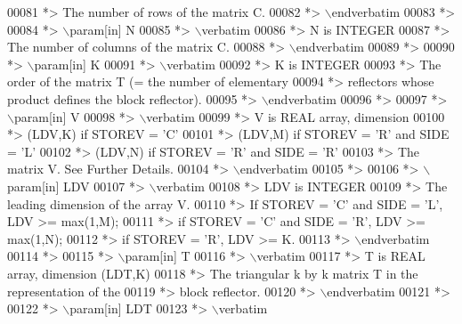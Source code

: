 \begin{DoxyCode}
00081 \textcolor{comment}{*>          The number of rows of the matrix C.}
00082 \textcolor{comment}{*> \(\backslash\)endverbatim}
00083 \textcolor{comment}{*>}
00084 \textcolor{comment}{*> \(\backslash\)param[in] N}
00085 \textcolor{comment}{*> \(\backslash\)verbatim}
00086 \textcolor{comment}{*>          N is INTEGER}
00087 \textcolor{comment}{*>          The number of columns of the matrix C.}
00088 \textcolor{comment}{*> \(\backslash\)endverbatim}
00089 \textcolor{comment}{*>}
00090 \textcolor{comment}{*> \(\backslash\)param[in] K}
00091 \textcolor{comment}{*> \(\backslash\)verbatim}
00092 \textcolor{comment}{*>          K is INTEGER}
00093 \textcolor{comment}{*>          The order of the matrix T (= the number of elementary}
00094 \textcolor{comment}{*>          reflectors whose product defines the block reflector).}
00095 \textcolor{comment}{*> \(\backslash\)endverbatim}
00096 \textcolor{comment}{*>}
00097 \textcolor{comment}{*> \(\backslash\)param[in] V}
00098 \textcolor{comment}{*> \(\backslash\)verbatim}
00099 \textcolor{comment}{*>          V is REAL array, dimension}
00100 \textcolor{comment}{*>                                (LDV,K) if STOREV = 'C'}
00101 \textcolor{comment}{*>                                (LDV,M) if STOREV = 'R' and SIDE = 'L'}
00102 \textcolor{comment}{*>                                (LDV,N) if STOREV = 'R' and SIDE = 'R'}
00103 \textcolor{comment}{*>          The matrix V. See Further Details.}
00104 \textcolor{comment}{*> \(\backslash\)endverbatim}
00105 \textcolor{comment}{*>}
00106 \textcolor{comment}{*> \(\backslash\)param[in] LDV}
00107 \textcolor{comment}{*> \(\backslash\)verbatim}
00108 \textcolor{comment}{*>          LDV is INTEGER}
00109 \textcolor{comment}{*>          The leading dimension of the array V.}
00110 \textcolor{comment}{*>          If STOREV = 'C' and SIDE = 'L', LDV >= max(1,M);}
00111 \textcolor{comment}{*>          if STOREV = 'C' and SIDE = 'R', LDV >= max(1,N);}
00112 \textcolor{comment}{*>          if STOREV = 'R', LDV >= K.}
00113 \textcolor{comment}{*> \(\backslash\)endverbatim}
00114 \textcolor{comment}{*>}
00115 \textcolor{comment}{*> \(\backslash\)param[in] T}
00116 \textcolor{comment}{*> \(\backslash\)verbatim}
00117 \textcolor{comment}{*>          T is REAL array, dimension (LDT,K)}
00118 \textcolor{comment}{*>          The triangular k by k matrix T in the representation of the}
00119 \textcolor{comment}{*>          block reflector.}
00120 \textcolor{comment}{*> \(\backslash\)endverbatim}
00121 \textcolor{comment}{*>}
00122 \textcolor{comment}{*> \(\backslash\)param[in] LDT}
00123 \textcolor{comment}{*> \(\backslash\)verbatim}

\end{DoxyCode}
